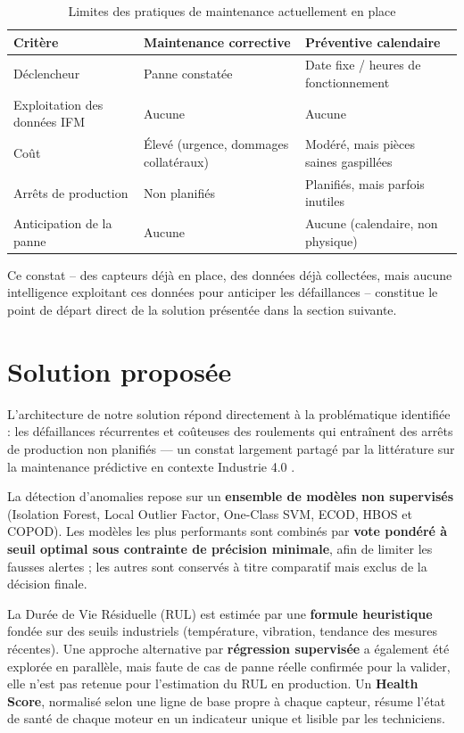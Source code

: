 \documentclass[12pt,a4paper]{report}
\begin{document}
\begin{table}[H]
\centering
\caption{Limites des pratiques de maintenance actuellement en place}
\label{tab:limites_existant}
\begin{tabular}{p{3.2cm}p{4.6cm}p{4.6cm}}
\toprule
\textbf{Critère} & \textbf{Maintenance corrective} & \textbf{Préventive calendaire} \\
\midrule
Déclencheur & Panne constatée & Date fixe / heures de fonctionnement \\
Exploitation des données IFM & Aucune & Aucune \\
Coût & Élevé (urgence, dommages collatéraux) & Modéré, mais pièces saines gaspillées \\
Arrêts de production & Non planifiés & Planifiés, mais parfois inutiles \\
Anticipation de la panne & Aucune & Aucune (calendaire, non physique) \\
\bottomrule
\end{tabular}
\end{table}

Ce constat -- des capteurs déjà en place, des données déjà collectées, mais aucune intelligence
exploitant ces données pour anticiper les défaillances -- constitue le point de départ direct de
la solution présentée dans la section suivante.

\section{Solution proposée}

L'architecture de notre solution répond directement à la problématique identifiée :
les défaillances récurrentes et coûteuses des roulements qui entraînent des arrêts
de production non planifiés — un constat largement partagé par la littérature sur la
maintenance prédictive en contexte Industrie 4.0 \cite{zonta2020}.

La détection d'anomalies repose sur un \textbf{ensemble de modèles non supervisés}
(Isolation Forest, Local Outlier Factor, One-Class SVM, ECOD, HBOS et COPOD). Les
modèles les plus performants sont combinés par \textbf{vote pondéré à seuil optimal
sous contrainte de précision minimale}, afin de limiter les fausses alertes ; les
autres sont conservés à titre comparatif mais exclus de la décision finale.

La Durée de Vie Résiduelle (RUL) est estimée par une \textbf{formule heuristique}
fondée sur des seuils industriels (température, vibration, tendance des mesures
récentes). Une approche alternative par \textbf{régression supervisée} a également
été explorée en parallèle, mais faute de cas de panne réelle confirmée pour la
valider, elle n'est pas retenue pour l'estimation du RUL en production. Un
\textbf{Health Score}, normalisé selon une ligne de base propre à chaque capteur,
résume l'état de santé de chaque moteur en un indicateur unique et lisible par les
techniciens.
\end{document}
